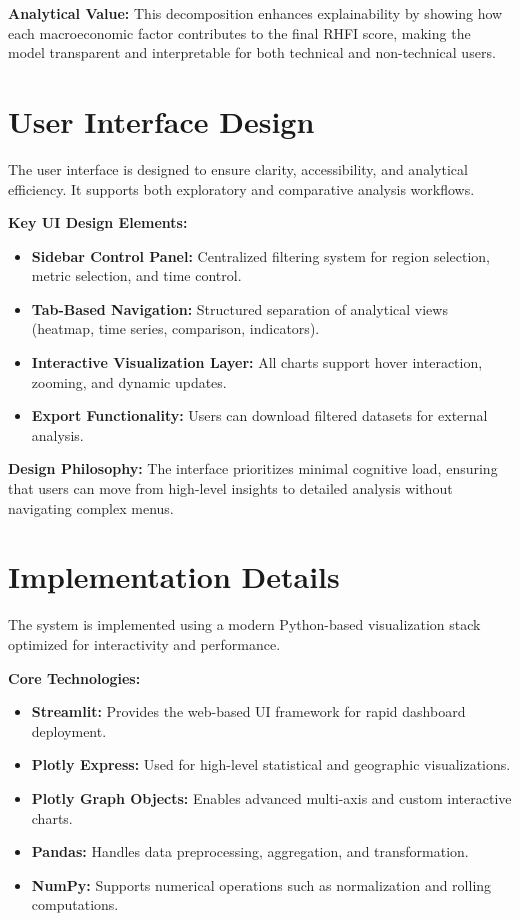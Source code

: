 \documentclass[11pt,twocolumn]{article}
\begin{document}
    \textbf{Analytical Value:}
    This decomposition enhances explainability by showing how each macroeconomic factor contributes to the final RHFI score, making the model transparent and interpretable for both technical and non-technical users.

    \section{User Interface Design}

    The user interface is designed to ensure clarity, accessibility, and analytical efficiency. It supports both exploratory and comparative analysis workflows.

    \textbf{Key UI Design Elements:}
    \begin{itemize}[leftmargin=1.2em]
        \item \textbf{Sidebar Control Panel:} Centralized filtering system for region selection, metric selection, and time control.

        \item \textbf{Tab-Based Navigation:} Structured separation of analytical views (heatmap, time series, comparison, indicators).

        \item \textbf{Interactive Visualization Layer:} All charts support hover interaction, zooming, and dynamic updates.

        \item \textbf{Export Functionality:} Users can download filtered datasets for external analysis.
    \end{itemize}

    \textbf{Design Philosophy:}
    The interface prioritizes minimal cognitive load, ensuring that users can move from high-level insights to detailed analysis without navigating complex menus.

    \section{Implementation Details}

    The system is implemented using a modern Python-based visualization stack optimized for interactivity and performance.

    \textbf{Core Technologies:}
    \begin{itemize}[leftmargin=1.2em]
        \item \textbf{Streamlit:} Provides the web-based UI framework for rapid dashboard deployment.
        \item \textbf{Plotly Express:} Used for high-level statistical and geographic visualizations.
        \item \textbf{Plotly Graph Objects:} Enables advanced multi-axis and custom interactive charts.
        \item \textbf{Pandas:} Handles data preprocessing, aggregation, and transformation.
        \item \textbf{NumPy:} Supports numerical operations such as normalization and rolling computations.
    \end{itemize}
\end{document}
